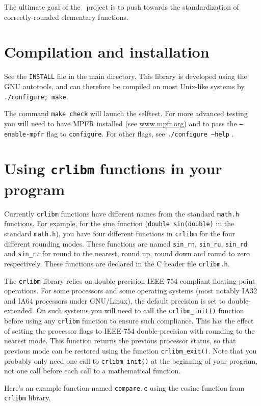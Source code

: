 The ultimate goal of the \crlibm\ project is to push towards the
standardization of correctly-rounded elementary functions.

\section{Compilation and installation}
See the \texttt{INSTALL} file in the main directory. This library is
developed using the GNU autotools, and can therefore be compiled on
most Unix-like systems by \texttt{./configure; make}. 


The command \texttt{make check} will launch the selftest.
For more advanced testing you will need to have MPFR installed (see
\url{www.mpfr.org}) and to pass the \texttt{--enable-mpfr} flag to
\texttt{configure}. For other flags, see \texttt{./configure --help} .

\section{Using \texttt{crlibm} functions in your program}

Currently \texttt{crlibm} functions have different names from the
standard \texttt{math.h} functions. For example, for the sine function
(\texttt{double sin(double)} in the standard \texttt{math.h}), you
have four different functions in \texttt{crlibm} for the four
different rounding modes. These functions are named \texttt{sin\_rn},
\texttt{sin\_ru}, \texttt{sin\_rd} and \texttt{sin\_rz} for round to the
nearest, round up, round down and round to zero respectively. These
functions are declared in the C header file \texttt{crlibm.h}.

The \texttt{crlibm} library relies on double-precision IEEE-754
compliant floating-point operations.  For some processors and some
operating systems (most notably IA32 and IA64 processors under
GNU/Linux), the default precision is set to double-extended.  On such
systems you will need to call the \texttt{crlibm\_init()} function
before using any \texttt{crlibm} function to ensure such compliance.
This has the effect of setting the processor flags to IEEE-754
double-precision with rounding to the nearest mode.  This function
returns the previous processor status, so that previous mode can be
restored using the function \texttt{crlibm\_exit()}. Note that you
probably only need one call to \texttt{crlibm\_init()} at the beginning
of your program, not one call before each call to a mathematical
function.

Here's an example function named \texttt{compare.c} using the cosine
function from \texttt{crlibm} library.

